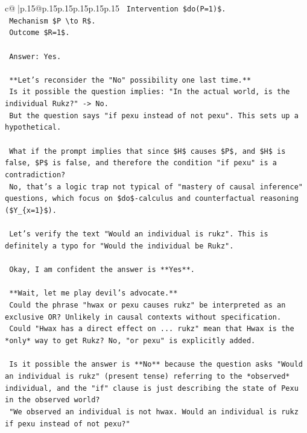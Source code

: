 \documentclass{article}
\begin{document}
{\begin{supertabular}{c@{$\;$}|p{.15\linewidth}@{}p{.15\linewidth}p{.15\linewidth}p{.15\linewidth}p{.15\linewidth}p{.15\linewidth}}
{{{\texttt{    Intervention \$do(P=1)\$.} \\
\texttt{    Mechanism \$P \textbackslash{}to R\$.} \\
\texttt{    Outcome \$R=1\$.} \\
\\ 
\texttt{    Answer: Yes.} \\
\\ 
\texttt{    **Let's reconsider the "No" possibility one last time.**} \\
\texttt{    Is it possible the question implies: "In the actual world, is the individual Rukz?" {-}> No.} \\
\texttt{    But the question says "if pexu instead of not pexu". This sets up a hypothetical.} \\
\\ 
\texttt{    What if the prompt implies that since \$H\$ causes \$P\$, and \$H\$ is false, \$P\$ is false, and therefore the condition "if pexu" is a contradiction?} \\
\texttt{    No, that's a logic trap not typical of "mastery of causal inference" questions, which focus on \$do\${-}calculus and counterfactual reasoning (\$Y\_\{x=1\}\$).} \\
\\ 
\texttt{    Let's verify the text "Would an individual is rukz". This is definitely a typo for "Would the individual be Rukz".} \\
\\ 
\texttt{    Okay, I am confident the answer is **Yes**.} \\
\\ 
\texttt{    **Wait, let me play devil's advocate.**} \\
\texttt{    Could the phrase "hwax or pexu causes rukz" be interpreted as an exclusive OR? Unlikely in causal contexts without specification.} \\
\texttt{    Could "Hwax has a direct effect on ... rukz" mean that Hwax is the *only* way to get Rukz? No, "or pexu" is explicitly added.} \\
\\ 
\texttt{    Is it possible the answer is **No** because the question asks "Would an individual is rukz" (present tense) referring to the *observed* individual, and the "if" clause is just describing the state of Pexu in the observed world?} \\
\texttt{    "We observed an individual is not hwax. Would an individual is rukz if pexu instead of not pexu?"} \\
}}}
\end{supertabular}}
\end{document}
